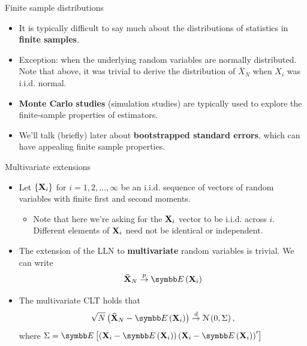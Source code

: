 \documentclass[aspectratio=169,11pt]{beamer}
\begin{document}
\begin{frame}{Finite sample distributions}
\begin{itemize}
	\item It is typically difficult to say much about the distributions of statistics 
			in {\bf finite samples}.

	\smallskip
	\item Exception: when the underlying random variables are normally distributed. Note that
			above, it was trivial to derive the distribution of $\bar{X}_N$ when $X_i$ was
			i.i.d. normal.
			
	\smallskip
	\item {\bf Monte Carlo studies} (simulation studies) are typically used to explore 
			the finite-sample properties of estimators. 
			
	\smallskip
	\item We'll talk (briefly) later about {\bf bootstrapped standard errors},
			which can have appealing finite sample properties. 

\end{itemize}
\end{frame}


\begin{frame}{Multivariate extensions}
\begin{itemize}
	\item Let $\left\{{\bf X}_i\right\}$ for $i=1,2,\dots,\infty$ be an i.i.d. sequence of vectors of random variables
			with finite first and second moments. 
	\begin{itemize}		
		\item Note that here we're asking for the ${\bf X}_i$ vector to be i.i.d. across $i$. Different elements of
		${\bf X}_i$ need not be identical or independent. 
	\end{itemize}


	\item The extension of the LLN to {\bf multivariate} random variables is trivial. We can write\[
			{\bf \bar{X}}_N \overset{p}{\rightarrow} \E\left( {\bf X}_i \right)
		\]
		
	\item The multivariate CLT holds that\[
		\sqrt{N} \left({\bf \bar{X}}_N - \E\left( {\bf X}_i \right) \right) \overset{d}{\rightarrow} \mathcal{N} \left(0,\Sigma\right),
	\]
	where $\Sigma = \E\left[\left({\bf X}_i - \E\left( {\bf X}_i \right)\right)\left({\bf X}_i - \E\left( {\bf X}_i \right)\right)'\right]$

\end{itemize}
\end{frame}
\end{document}
